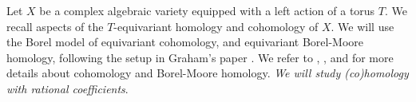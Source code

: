 \documentclass[10pt]{article}
\numberwithin{thm}{section}
\theoremstyle{definition}
\theoremstyle{remark}
\begin{document}
Let $X$ be a complex algebraic variety equipped with a left action of a torus $T$.
We recall aspects of the $T$-equivariant homology and cohomology of $X$.
We will use the Borel model of equivariant cohomology,
and equivariant Borel-Moore homology,
following the setup in Graham's paper \cite{graham:positivity}. 
We refer to \cite[Ch~19]{fulton:IT}, \cite[Appendix~B]{fulton:young}, and \cite[\S 2.6]{chriss.ginzburg}
for more details about cohomology and Borel-Moore homology. 
\emph{We will study (co)homology with rational coefficients}.

%
%
\end{document}
